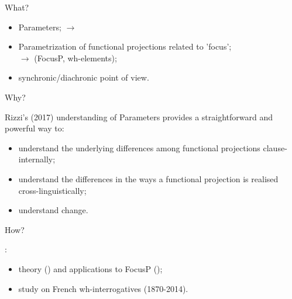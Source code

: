 \documentclass[lesson_slides]{subfiles}
\begin{document}
\begin{frame}[c]{What?}

    \begin{itemize}
        \item[\ding{227}] Parameters; \pause $\longrightarrow$ \cite{rizzi2017} \pause
        \item[\ding{227}] Parametrization of functional projections related to 'focus';\\ \pause
        $\longrightarrow$ (FocusP, wh-elements); \pause
        \item[\ding{227}] synchronic/diachronic point of view.
    \end{itemize}
    
\end{frame}
\begin{frame}[c]{Why?}

    Rizzi's (2017) understanding of Parameters provides a straightforward and powerful way to:
    \begin{itemize}
        \item[\ding{227}] understand the underlying differences among functional projections clause-internally; \pause 
        \item[\ding{227}] understand the differences in the ways a functional projection is realised cross-linguistically;
        \item[\ding{227}] understand change.
    \end{itemize}
  
\end{frame}
\begin{frame}[c]{How?}

    :
    \begin{itemize}
        \item[\ding{227}] theory (\cite{rizzi1997fine}) and applications to FocusP (\cite{samo2019cartography}); \pause 
        \item[\ding{227}] study on French wh-interrogatives \pause (1870-2014).
    \end{itemize}
\end{frame}
\end{document}
